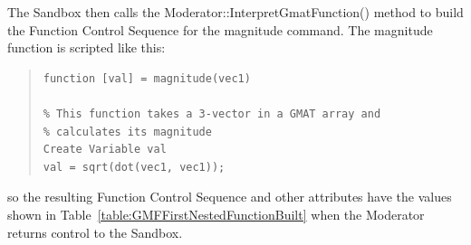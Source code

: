 The Sandbox then calls the Moderator::InterpretGmatFunction() method to build the Function Control
Sequence for the magnitude command.  The magnitude function is scripted like this:

\begin{quote}
\begin{verbatim}
function [val] = magnitude(vec1)

% This function takes a 3-vector in a GMAT array and
% calculates its magnitude
Create Variable val
val = sqrt(dot(vec1, vec1));
\end{verbatim}
\end{quote}

\noindent so the resulting Function Control Sequence and other attributes have the values shown in
Table~\ref{table:GMFFirstNestedFunctionBuilt} when the Moderator returns control to the Sandbox.

